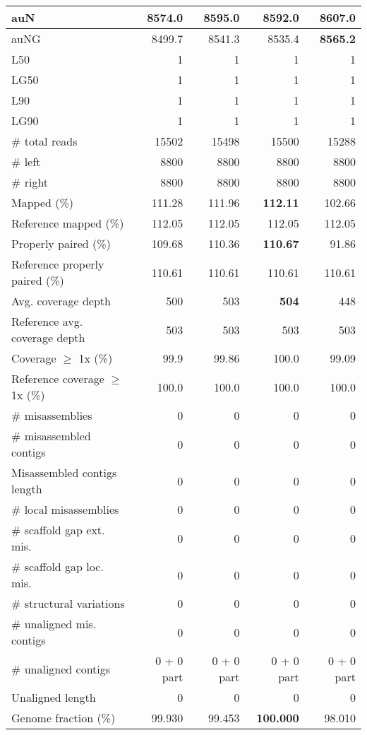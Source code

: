 \documentclass[12pt,a4paper]{article}
\begin{document}
\begin{table}[ht]
\begin{center}
\begin{tabular}{|l*{4}{|r}|}
auN & 8574.0 & 8595.0 & 8592.0 & {\bf 8607.0} \\ \hline
auNG & 8499.7 & 8541.3 & 8535.4 & {\bf 8565.2} \\ \hline
L50 & 1 & 1 & 1 & 1 \\ \hline
LG50 & 1 & 1 & 1 & 1 \\ \hline
L90 & 1 & 1 & 1 & 1 \\ \hline
LG90 & 1 & 1 & 1 & 1 \\ \hline
\# total reads & 15502 & 15498 & 15500 & 15288 \\ \hline
\# left & 8800 & 8800 & 8800 & 8800 \\ \hline
\# right & 8800 & 8800 & 8800 & 8800 \\ \hline
Mapped (\%) & 111.28 & 111.96 & {\bf 112.11} & 102.66 \\ \hline
Reference mapped (\%) & 112.05 & 112.05 & 112.05 & 112.05 \\ \hline
Properly paired (\%) & 109.68 & 110.36 & {\bf 110.67} & 91.86 \\ \hline
Reference properly paired (\%) & 110.61 & 110.61 & 110.61 & 110.61 \\ \hline
Avg. coverage depth & 500 & 503 & {\bf 504} & 448 \\ \hline
Reference avg. coverage depth & 503 & 503 & 503 & 503 \\ \hline
Coverage $\geq$ 1x (\%) & 99.9 & 99.86 & 100.0 & 99.09 \\ \hline
Reference coverage $\geq$ 1x (\%) & 100.0 & 100.0 & 100.0 & 100.0 \\ \hline
\# misassemblies & 0 & 0 & 0 & 0 \\ \hline
\# misassembled contigs & 0 & 0 & 0 & 0 \\ \hline
Misassembled contigs length & 0 & 0 & 0 & 0 \\ \hline
\# local misassemblies & 0 & 0 & 0 & 0 \\ \hline
\# scaffold gap ext. mis. & 0 & 0 & 0 & 0 \\ \hline
\# scaffold gap loc. mis. & 0 & 0 & 0 & 0 \\ \hline
\# structural variations & 0 & 0 & 0 & 0 \\ \hline
\# unaligned mis. contigs & 0 & 0 & 0 & 0 \\ \hline
\# unaligned contigs & 0 + 0 part & 0 + 0 part & 0 + 0 part & 0 + 0 part \\ \hline
Unaligned length & 0 & 0 & 0 & 0 \\ \hline
Genome fraction (\%) & 99.930 & 99.453 & {\bf 100.000} & 98.010 \\ \hline

\end{tabular}
\end{center}
\end{table}
\end{document}
